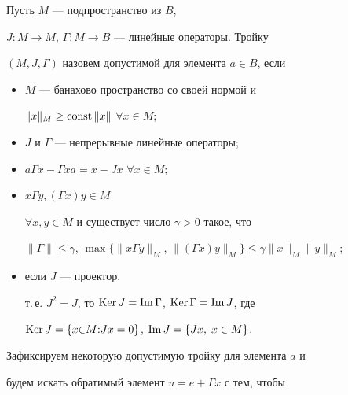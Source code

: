 \begin{defn}


Пусть $M$ --- подпространство из $B$,


$J:M\to M$, $\Gamma:M\to B$ --- линейные операторы. Тройку


$(M,J,\Gamma)$ назовем допустимой для элемента $a\in B$, если


\begin{itemize}


\item[1)] $M$ --- банахово пространство  со своей нормой и


$\|x\|_M\ge  \operatorname{const}\|x\|$ $\forall x\in M$;





\item[2)] $J$ и $\Gamma$ --- непрерывные линейные  операторы;





\item[3)] $a\Gamma x-\Gamma xa=x-Jx$ $\forall x\in M$;





\item[4)] $x\Gamma y, (\Gamma x)y\in M$


$\forall x,y\in M$ и существует число $\gamma>0$ такое, что


$\|\Gamma\|\le\gamma$, $\max\{\|x\Gamma y\|_M$, $\|(\Gamma


x)y\|_M\}\le\gamma\|x\|_M\|y\|_M$;










\item[5)] если $J$ --- проектор,


т.\,е. $J^2=J$, то $\operatorname{Ker} J=\operatorname{Im}\Gamma$, $\operatorname{Ker}\Gamma=\operatorname{Im} J$, где 


$\operatorname{Ker} J = \{x{\in} M{:}Jx=0\}$, $\operatorname{Im} J=\{Jx,\; x\in M\}$.


\end{itemize}


\end{defn}





Зафиксируем некоторую допустимую тройку для элемента $a$ и


будем искать обратимый элемент $u=e+\Gamma x$ с тем, чтобы


